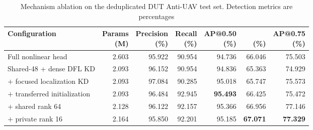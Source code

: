 \begin{table}[!t]
\caption{Mechanism ablation on the deduplicated DUT Anti-UAV test set. Detection metrics are percentages\label{tab:mechanism}}
\centering\srpatablesetup
\begin{tabular}{p{}rrrrrr}
\toprule
Configuration & \shortstack{Params\\(M)} & \shortstack{Precision\\(\%)} & \shortstack{Recall\\(\%)} & \shortstack{AP@0.50\\(\%)} & \shortstack{\mapall{}\\(\%)} & \shortstack{AP@0.75\\(\%)}\\
\midrule
Full nonlinear head & 2.603 & 95.922 & 90.954 & 94.736 & 66.046 & 75.503\\
Shared-48 + dense DFL KD & 2.093 & 96.152 & 90.954 & 94.836 & 65.363 & 74.929\\
$+$ focused localization KD & 2.093 & 97.084 & 90.285 & 95.018 & 65.747 & 75.573\\
$+$ transferred initialization & 2.093 & 96.484 & 92.945 & \textbf{95.493} & 66.425 & 75.472\\
$+$ shared rank 64 & 2.128 & 96.122 & 92.157 & 95.366 & 66.956 & 77.146\\
$+$ private rank 16 & 2.164 & 95.850 & 92.201 & 95.185 & \textbf{67.071} & \textbf{77.329}\\
\bottomrule
\end{tabular}
\end{table}
